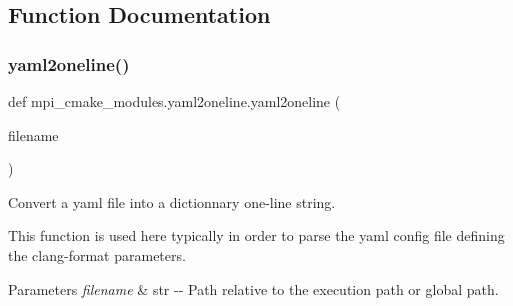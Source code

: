 \subsection{Function Documentation}
\mbox{\label{namespacempi__cmake__modules_1_1yaml2oneline_a82021b35eab75040f7372ecfd4f21b0d}} 
\subsubsection{\texorpdfstring{yaml2oneline()}{yaml2oneline()}}
{\footnotesize\ttfamily def mpi\+\_\+cmake\+\_\+modules.\+yaml2oneline.\+yaml2oneline (\begin{DoxyParamCaption}\item[{}]{filename }\end{DoxyParamCaption})}



Convert a yaml file into a dictionnary one-\/line string. 

This function is used here typically in order to parse the yaml config file defining the clang-\/format parameters.


\begin{DoxyParams}{Parameters}
{\em filename} & str {\ttfamily -\/-\/} Path relative to the execution path or global path. \\
\hline
\end{DoxyParams}

